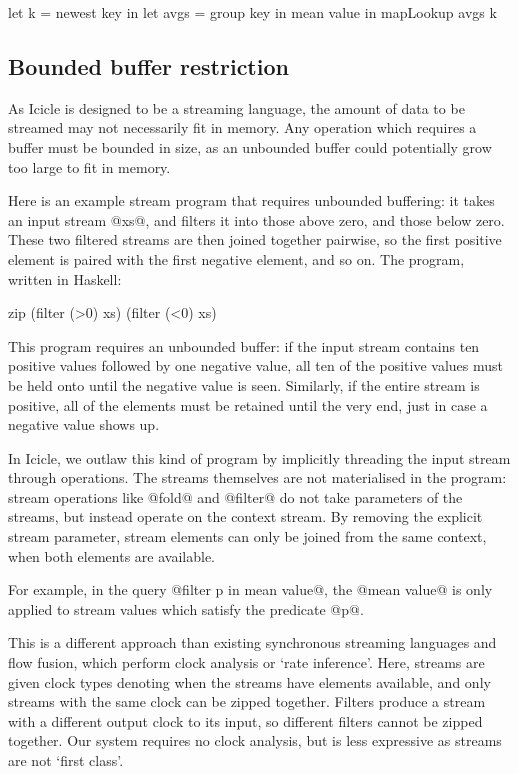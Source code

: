 \begin{code}
   let k    = newest key
in let avgs = group  key in mean value
in mapLookup avgs k
\end{code}

\subsection{Bounded buffer restriction}
\label{s:IcicleSource:bounded}
As Icicle is designed to be a streaming language, the amount of data to be streamed may not necessarily fit in memory.
Any operation which requires a buffer must be bounded in size, as an unbounded buffer could potentially grow too large to fit in memory.

Here is an example stream program that requires unbounded buffering:
it takes an input stream @xs@, and filters it into those above zero, and those below zero.
These two filtered streams are then joined together pairwise, so the first positive element is paired with the first negative element, and so on.
The program, written in Haskell:

\begin{code}
zip (filter (>0) xs) (filter (<0) xs)
\end{code}

This program requires an unbounded buffer: if the input stream contains ten positive values followed by one negative value, all ten of the positive values must be held onto until the negative value is seen.
Similarly, if the entire stream is positive, all of the elements must be retained until the very end, just in case a negative value shows up.

In Icicle, we outlaw this kind of program by implicitly threading the input stream through operations.
The streams themselves are not materialised in the program: stream operations like @fold@ and @filter@ do not take parameters of the streams, but instead operate on the context stream.
By removing the explicit stream parameter, stream elements can only be joined from the same context, when both elements are available.

For example, in the query @filter p in mean value@, the @mean value@ is only applied to stream values which satisfy the predicate @p@.

This is a different approach than existing synchronous streaming languages\cite{mandel2010lucy} and flow fusion\cite{lippmeier2013data}, which perform clock analysis or `rate inference'.
Here, streams are given clock types denoting when the streams have elements available, and only streams with the same clock can be zipped together.
Filters produce a stream with a different output clock to its input, so different filters cannot be zipped together.
Our system requires no clock analysis, but is less expressive as streams are not `first class'.

